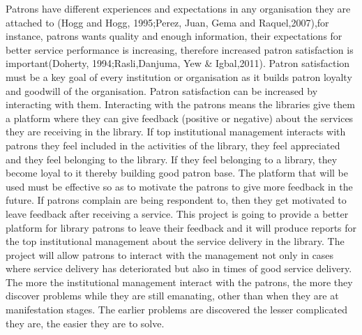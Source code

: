 \documentclass[12pt]{report}
\begin{document}
	Patrons have different experiences and expectations in any organisation they are attached to (Hogg and Hogg, 1995;Perez, Juan, Gema and  Raquel,2007),for instance, patrons wants quality and enough information, their expectations for better service performance is increasing, therefore increased patron satisfaction is important(Doherty, 1994;Rasli,Danjuma, Yew \& Igbal,2011). Patron satisfaction must be a key goal of every institution or organisation as it builds patron loyalty and goodwill of the organisation. Patron satisfaction can be increased by interacting with them. Interacting with the patrons means the libraries give them a platform where they can give feedback (positive or negative) about the services they are receiving in the library. If top institutional management interacts with patrons they feel included in the activities of the library, they feel appreciated and they feel belonging to the library. If they feel belonging to a library, they become loyal to it thereby building good patron base. The platform that will be used must be effective so as to motivate the patrons to give more feedback in the future. If patrons complain are being respondent to, then they get motivated to leave feedback after receiving a service. This project is going to provide a better platform for library patrons to leave their feedback and it will produce reports for the top institutional management about the service delivery in the library. The project will allow patrons to interact with the management not only in cases where service delivery has deteriorated but also in times of good service delivery. The more the institutional management interact with the patrons, the more they discover problems while they are still emanating, other than when they are at manifestation stages. The earlier problems are discovered the lesser complicated they are, the easier they are to solve.
	
\end{document}
